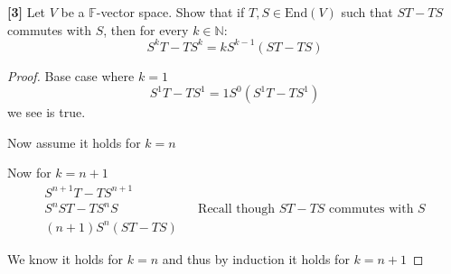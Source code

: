 \documentclass[12pt]{article}
\begin{document}
\textbf{[3]}
Let $V$ be a $\mathbb{F}$-vector space. Show that if $T,S \in \text{End}(V)$ such that $ST - TS$ commutes with $S$, then for every $k \in \mathbb{N}$:
    \begin{equation*}
    S^kT - TS^k = kS^{k-1}(ST - TS)
    \end{equation*} 

    \begin{proof}
        Base case where $k = 1$
        \[S^1T - TS^1 = 1S^0(S^1T -TS^1)\]
        we see is true.

        Now assume it holds for $k = n$

        Now for $k = n +1$
        \begin{align*}
            S^{n+1}T - TS^{n+1} \\
            S^nST - TS^nS && \text{Recall though $ST-TS$ commutes with $S$} \\
            (n+1)S^n(ST-TS)
        \end{align*}

        We know it holds for $k = n$ and thus by induction it holds for $k = n+1$
    \end{proof}
\end{document}

